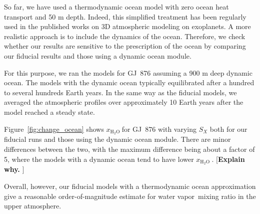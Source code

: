 \documentclass[11pt,numberedappendix,twocolappendix,]{emulateapj}
\def\water{H$_2$O }
\def\xwater{$x_\text{\water}$}
\def\memo#1{\color{red}$[${\bf #1}$]$ \color{black}}
\newcommand{\dsa}[1]{{\color{blue}#1}}
\newcommand{\wv}{{\color{orange}water vapor\ }}
\begin{document}
So far, we have used a thermodynamic ocean model with zero ocean heat transport and 50 m depth. 
Indeed, this simplified treatment has been regularly used in the published works on 3D atmospheric modeling on exoplanets. 
A more realistic approach is to include the dynamics of the ocean. 
Therefore, we check whether our results are sensitive to the prescription of the ocean by comparing our fiducial results and those using a dynamic ocean module. 

For this purpose, we ran the models for GJ~876 assuming a 900 m deep dynamic ocean. 
The models with the dynamic ocean typically equilibrated after a hundred to several hundreds Earth years. 
In the same way as the fiducial models, we averaged the atmospheric profiles  over approximately 10 Earth years after the model reached a steady state. 

Figure~\ref{fig:change_ocean} shows \xwater for GJ~876 with varying $S_X$ both for our fiducial runs and those using the dynamic ocean module.  
There are minor differences between the two, with the maximum difference being about a factor of 5, where the models with a dynamic ocean tend to have lower \xwater. 
\memo{Explain why. }

Overall, however, our fiducial models with a thermodynamic ocean approximation give a reasonable order-of-magnitude estimate for \wv mixing ratio in the upper atmosphere. 
\end{document}
